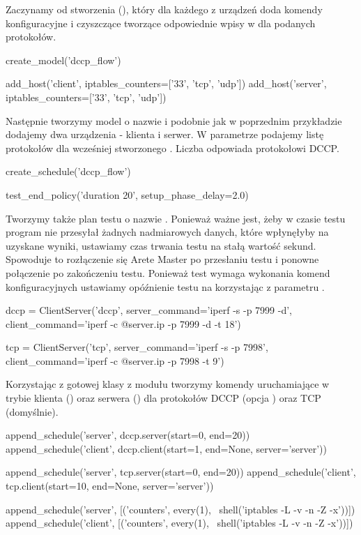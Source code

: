 \documentclass[00-praca-magisterska.tex]{subfiles}
\begin{document}
Zaczynamy od stworzenia  (),
który dla każdego z urządzeń doda komendy konfiguracyjne i czyszczące tworzące
odpowiednie wpisy w  dla podanych protokołów.

\begin{pythoncode}
  create_model('dccp_flow')

  add_host('client', iptables_counters=['33', 'tcp', 'udp'])
  add_host('server', iptables_counters=['33', 'tcp', 'udp'])
\end{pythoncode}

Następnie tworzymy model o nazwie  i podobnie jak w poprzednim
przykładzie dodajemy dwa urządzenia - klienta i serwer. W parametrze
 podajemy listę protokołów dla wcześniej stworzonego
. Liczba  odpowiada protokołowi DCCP.

\begin{pythoncode}
  create_schedule('dccp_flow')

  test_end_policy('duration 20', setup_phase_delay=2.0)
\end{pythoncode}

Tworzymy także plan testu o nazwie . Ponieważ ważne jest, żeby
w czasie testu program nie przesyłał żadnych nadmiarowych danych, które
wpłynęłyby na uzyskane wyniki, ustawiamy czas trwania testu na stałą wartość
 sekund. Spowoduje to rozłączenie się Arete Master po przesłaniu testu
i ponowne połączenie po zakończeniu testu. Ponieważ test wymaga wykonania komend
konfiguracyjnych ustawiamy opóźnienie testu na  korzystając z
parametru .

\begin{pythoncode}
  dccp = ClientServer('dccp',
      server_command='iperf -s -p 7999 -d',
      client_command='iperf -c @{server.ip} -p 7999 -d -t 18')

  tcp = ClientServer('tcp',
      server_command='iperf -s -p 7998',
      client_command='iperf -c @{server.ip} -p 7998 -t 9')
\end{pythoncode}

Korzystając z gotowej klasy  z modułu  tworzymy
komendy uruchamiające  w trybie klienta () oraz serwera
() dla protokołów DCCP (opcja ) oraz TCP (domyślnie).

\begin{pythoncode}
  append_schedule('server', dccp.server(start=0, end=20))
  append_schedule('client', dccp.client(start=1, end=None, server='server'))

  append_schedule('server', tcp.server(start=0, end=20))
  append_schedule('client', tcp.client(start=10, end=None, server='server'))

  append_schedule('server', [('counters', every(1), \
      shell('iptables -L -v -n -Z -x'))])
  append_schedule('client', [('counters', every(1), \
      shell('iptables -L -v -n -Z -x'))])
\end{pythoncode}
\end{document}
